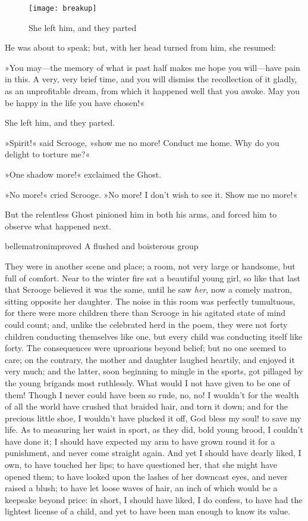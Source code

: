 \begin{figure}[tb]
\centering
\texttt{[image: breakup]}
\caption{She left him, and they parted}
\end{figure}

He was about to speak; but, with her head turned from him, she resumed:

»You may---the memory of what is past half makes me hope you will---have pain in this. A very, very brief time, and you will dismiss the recollection of it gladly, as an unprofitable dream, from which it happened well that you awoke. May you be happy in the life you have chosen!«

She left him, and they parted.

»Spirit!« said Scrooge, »show me no more! Conduct me home. Why do you delight to torture me?«

»One shadow more!« exclaimed the Ghost.

»No more!« cried Scrooge. »No more! I don't wish to see it. Show me no more!«

But the relentless Ghost pinioned him in both his arms, and forced him to observe what happened next.

\begin{colorbigpic}
	[\bigpicsize]
	{bellematronimproved}
	{A flushed and boisterous group}
\end{colorbigpic}


They were in another scene and place; a room, not very large or handsome, but full of comfort. Near to the winter fire sat a beautiful young girl, so like that last that Scrooge believed it was the same, until he saw \textit{her}, now a comely matron, sitting opposite her daughter. The noise in this room was perfectly tumultuous, for there were more children there than Scrooge in his agitated state of mind could count; and, unlike the celebrated herd in the poem, they were not forty children conducting themselves like one, but every child was conducting itself like forty. The consequences were uproarious beyond belief; but no one seemed to care; on the contrary, the mother and daughter laughed heartily, and enjoyed it very much; and the latter, soon beginning to mingle in the sports, got pillaged by the young brigands most ruthlessly. What would I not have given to be one of them! Though I never could have been so rude, no, no! I wouldn't for the wealth of all the world have crushed that braided hair, and torn it down; and for the precious little shoe, I wouldn't have plucked it off, God bless my soul! to save my life. As to measuring her waist in sport, as they did, bold young brood, I couldn't have done it; I should have expected my arm to have grown round it for a punishment, and never come straight again. And yet I should have dearly liked, I own, to have touched her lips; to have questioned her, that she might have opened them; to have looked upon the lashes of her downcast eyes, and never raised a blush; to have let loose waves of hair, an inch of which would be a keepsake beyond price: in short, I should have liked, I do confess, to have had the lightest license of a child, and yet to have been man enough to know its value.

